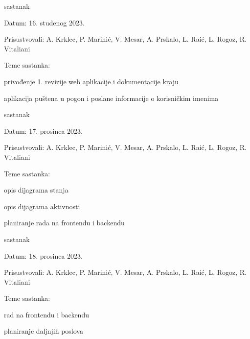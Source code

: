 \begin{packed_enum}
	\item  sastanak
	\item[] \begin{packed_item}
		\item Datum: 16. studenog 2023.
		\item Prisustvovali: A. Krklec, P. Marinić, V. Mesar, A. Prskalo, L. Raić, L. Rogoz, R. Vitaliani
		\item Teme sastanka:
		\begin{packed_item}
			\item privođenje 1. revizije web aplikacije i dokumentacije kraju
			\item aplikacija puštena u pogon i poslane informacije o korisničkim imenima
		\end{packed_item}
	\end{packed_item}
	
	\item  sastanak
	\item[] \begin{packed_item}
		\item Datum: 17. prosinca 2023.
		\item Prisustvovali: A. Krklec, P. Marinić, V. Mesar, A. Prskalo, L. Raić, L. Rogoz, R. Vitaliani
		\item Teme sastanka:
		\begin{packed_item}
			\item opis dijagrama stanja
			\item opis dijagrama aktivnosti
			\item planiranje rada na frontendu i backendu
		\end{packed_item}
	\end{packed_item}
	
	\item  sastanak
	\item[] \begin{packed_item}
		\item Datum: 18. prosinca 2023.
		\item Prisustvovali: A. Krklec, P. Marinić, V. Mesar, A. Prskalo, L. Raić, L. Rogoz, R. Vitaliani
		\item Teme sastanka:
		\begin{packed_item}
			\item rad na frontendu i backendu
			\item planiranje daljnjih poslova
		\end{packed_item}
	\end{packed_item}
	

\end{packed_enum}
